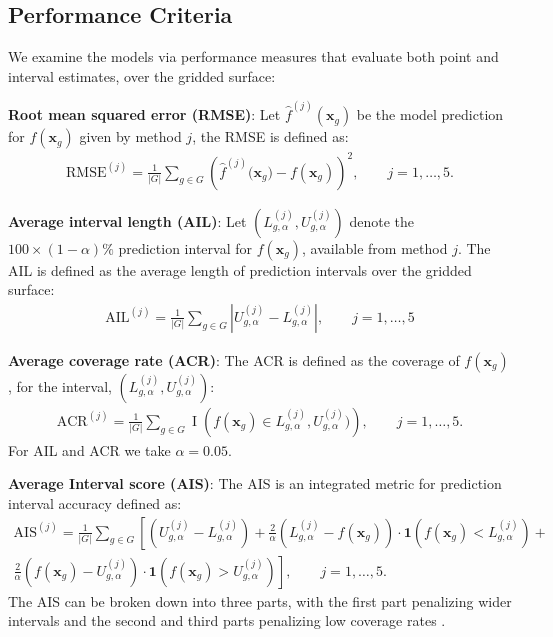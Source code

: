 \documentclass[preprint,12pt,authoryear]{elsarticle}
\begin{document}
{\subsection{Performance Criteria}
\label{sec:perfc}


{
 We examine the models via performance measures that evaluate both point and interval estimates, over the gridded surface:} %
\begin{itemize}
        {\item \textbf{Root mean squared error (RMSE)}: Let $\hat{f}^{(j)}(\boldsymbol{x}_g)$ be the model prediction for $f(\boldsymbol{x}_g)$ given by method $j$, the RMSE is defined as:
        \begin{align*}
            \text{RMSE}^{(j)} = \frac{1}{|G|}\sum_{g \in G}\left({\hat f^{(j)}(\boldsymbol{x}_g}) - f(\boldsymbol{x}_g)\right)^2, \qquad j =1,\ldots, 5.
        \end{align*}
        \item \textbf{Average interval length (AIL)}: Let $(L_{g,\alpha}^{(j)}, U_{g,\alpha}^{(j)})$ denote the $100 \times (1 - \alpha) \%$ prediction interval for $f(\boldsymbol{x}_g)$, available from method $j$. The AIL is defined as the average length of prediction intervals over the gridded surface:
        \begin{align*}
            \text{AIL}^{(j)} = \frac{1}{|G|}\sum_{g \in G}|U_{g, \alpha}^{(j)} - L_{g, \alpha}^{(j)}|, \qquad j =1,\ldots, 5
        \end{align*}}
	\item \textbf{Average coverage rate (ACR)}: 
    The ACR is defined as the coverage of $f(\boldsymbol{x}_g)$, for the interval, $(L_{g,\alpha}^{(j)}, U_{g,\alpha}^{(j)})$:
	\begin{align*}
		\text{ACR}^{(j)} = \frac{1}{|G|} \sum_{g \in G} \operatorname{I}\left(f(\boldsymbol{x}_g) \in L_{g,\alpha}^{(j)}, U_{g,\alpha}^{(j)})\right), \qquad j =1,\ldots, 5.
	\end{align*}
	For AIL and ACR we take $\alpha = 0.05$.
	\item \textbf{Average Interval score (AIS)}: The AIS is an integrated metric for prediction interval accuracy defined as: 
	\begin{multline*}
		\text{AIS}^{(j)} = \frac{1}{|G|} \sum_{g \in G} \left[ (U_{g,\alpha}^{(j)} -  L_{g,\alpha}^{(j)}) + \frac{2}{\alpha} \left(L_{g,\alpha}^{(j)} - f(\boldsymbol{x}_g) \right) \cdot \mathbf{1}(f(\boldsymbol{x}_g) < L_{g,\alpha}^{(j)})\right. + \\ \left.
		\frac{2}{\alpha} \left(f(\boldsymbol{x}_g) - U_{g,\alpha}^{(j)}\right) \cdot \mathbf{1}(f(\boldsymbol{x}_g) > U_{g,\alpha}^{(j)}) \right],  \qquad j =1,\ldots, 5.
	\end{multline*}
The AIS can be broken down into three parts, with the first part penalizing  wider intervals and the second and third parts penalizing low coverage rates \citealp{gneiting2007strictly}.


\end{itemize}}
\end{document}
